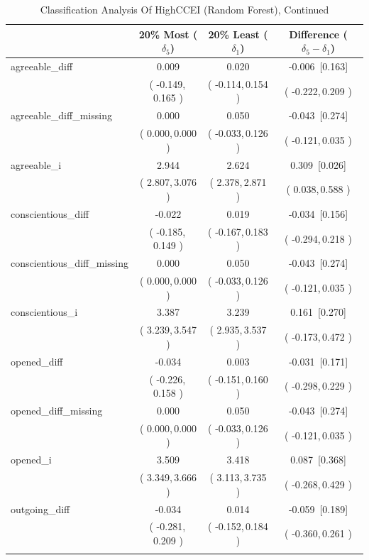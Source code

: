 \documentclass[11 pt]{article}
\begin{document}
\begin{table}[H]
\centering
\footnotesize
\begin{threeparttable}
\caption{Classification Analysis Of HighCCEI (Random Forest), Continued}\label{tab:clan_clb_rf2}
\begin{tabular}{lccc}
\toprule \hline
 & 20\% Most ($\delta_5$) & 20\% Least ($\delta_1$) & Difference ($\delta_5-\delta_1$) \\
\midrule
agreeable\_diff & 0.009 & 0.020 & -0.006 \,[0.163] \\
& ( -0.149,\,0.165 ) & ( -0.114,\,0.154 ) & ( -0.222,\,0.209 ) \\
\addlinespace
agreeable\_diff\_missing & 0.000 & 0.050 & -0.043 \,[0.274] \\
& ( 0.000,\,0.000 ) & ( -0.033,\,0.126 ) & ( -0.121,\,0.035 ) \\
\addlinespace
agreeable\_i & 2.944 & 2.624 & 0.309 \,[0.026] \\
& ( 2.807,\,3.076 ) & ( 2.378,\,2.871 ) & ( 0.038,\,0.588 ) \\
\addlinespace
conscientious\_diff & -0.022 & 0.019 & -0.034 \,[0.156] \\
& ( -0.185,\,0.149 ) & ( -0.167,\,0.183 ) & ( -0.294,\,0.218 ) \\
\addlinespace
conscientious\_diff\_missing & 0.000 & 0.050 & -0.043 \,[0.274] \\
& ( 0.000,\,0.000 ) & ( -0.033,\,0.126 ) & ( -0.121,\,0.035 ) \\
\addlinespace
conscientious\_i & 3.387 & 3.239 & 0.161 \,[0.270] \\
& ( 3.239,\,3.547 ) & ( 2.935,\,3.537 ) & ( -0.173,\,0.472 ) \\
\addlinespace
opened\_diff & -0.034 & 0.003 & -0.031 \,[0.171] \\
& ( -0.226,\,0.158 ) & ( -0.151,\,0.160 ) & ( -0.298,\,0.229 ) \\
\addlinespace
opened\_diff\_missing & 0.000 & 0.050 & -0.043 \,[0.274] \\
& ( 0.000,\,0.000 ) & ( -0.033,\,0.126 ) & ( -0.121,\,0.035 ) \\
\addlinespace
opened\_i & 3.509 & 3.418 & 0.087 \,[0.368] \\
& ( 3.349,\,3.666 ) & ( 3.113,\,3.735 ) & ( -0.268,\,0.429 ) \\
\addlinespace
outgoing\_diff & -0.034 & 0.014 & -0.059 \,[0.189] \\
& ( -0.281,\,0.209 ) & ( -0.152,\,0.184 ) & ( -0.360,\,0.261 ) \\
\addlinespace

\end{tabular}
\end{threeparttable}
\end{table}
\end{document}
